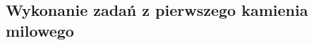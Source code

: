 \documentclass[a4paper,11pt, notitlepage ]{article}
\begin{document}
\subsection{Wykonanie zadań z pierwszego kamienia milowego}

\end{document}
